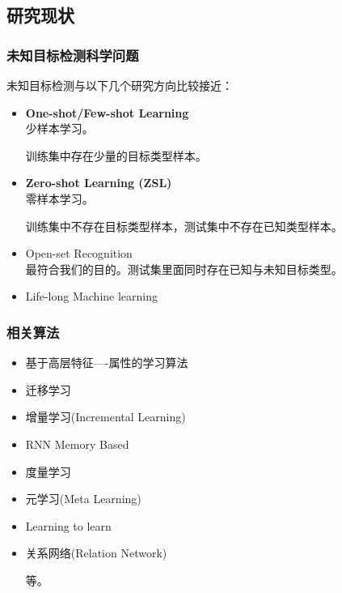 \documentclass{beamer}
\begin{document}
\subsection{研究现状}

\begin{frame}
\frametitle{未知目标检测科学问题}
未知目标检测与以下几个研究方向比较接近：

\begin{itemize}
\item \textbf{One-shot/Few-shot Learning} \\
少样本学习。

训练集中存在少量的目标类型样本。

\item \textbf{Zero-shot Learning (ZSL)} \\
零样本学习。

训练集中不存在目标类型样本，测试集中不存在已知类型样本。

\item Open-set Recognition \\
最符合我们的目的。测试集里面同时存在已知与未知目标类型。

\item Life-long Machine learning

\end{itemize}


\end{frame}

\begin{frame}
\frametitle{相关算法}

\begin{itemize}
\item 基于高层特征----属性的学习算法

\item 迁移学习

\item 增量学习(Incremental Learning)

\item RNN Memory Based

\item 度量学习

\item 元学习(Meta Learning)

\item Learning to learn

\item 关系网络(Relation Network)

等。

\end{itemize}

\end{frame}
\end{document}

